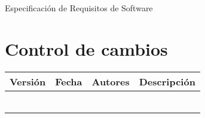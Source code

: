 \documentclass[12pt]{article}
\title{\nombredelproyecto}
\author{Alejandro Barrachina Argudo \\
David Cantador Piedras \\
Rodrigo Sosa Sáez \\
Juan Pantaleón Femenía Quevedo \\
David Llanes Martín \\
Sergio Sánchez Chamizo  \\
Samuel Rodríguez Moreno \\
Rodrigo Souto Santos
}
\date{\today}
\begin{document}
\begin{titlepage}
	\makeatletter
	{
		\centering
		\vspace*{4cm}
		{\fontsize{40pt}{40pt}\scshape\textbf{\@title}\par}


		{\Huge Especificación de Requisitos de Software\par}

		\vspace*{1cm}
		{\Large\itshape
			\@author
			\par}
	}
	\vfill
	\makeatother
\end{titlepage}
\newpage

\section*{Control de cambios} %
\noindent\begin{tabularx}{\textwidth}{ |l|l|p{5cm}|X| }
	\hline
	\textbf{Versión} & \textbf{Fecha} & \textbf{Autores} & \textbf{Descripción} \\
	\hline
	                 &                &                  &                      \\
	\hline
	                 &                &                  &                      \\
	\hline
	                 &                &                  &                      \\
	\hline
	                 &                &                  &                      \\
	\hline
	                 &                &                  &                      \\
	\hline
	                 &                &                  &                      \\
	\hline
\end{tabularx}

\newpage
\tableofcontents
\newpage

\newpage

\newpage

\newpage

\newpage

\newpage

\newpage

\newpage

\end{document}
